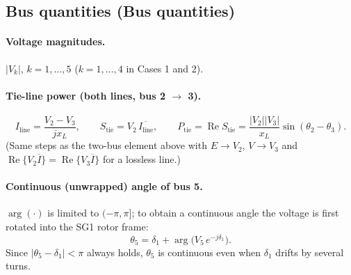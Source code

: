 \documentclass[11pt,a4paper]{article}
\numberwithin{equation}{section}
\newcommand{\cj}[1]{\overline{#1}}
\newcommand{\re}{\operatorname{Re}}
\newcommand{\blk}[1]{\textsf{#1}}
\begin{document}
\subsection{Bus quantities (\blk{Bus quantities})}
\paragraph{Voltage magnitudes.} $|V_k|$, $k=1,\dots,5$ ($k=1,\dots,4$ in Cases 1 and 2).

\paragraph{Tie-line power (both lines, bus 2 $\to$ 3).}
\begin{equation}
I_{\text{line}} = \frac{V_2 - V_3}{jx_L},\qquad
S_{\text{tie}} = V_2\,\cj{I_{\text{line}}},\qquad
\boxed{P_{\text{tie}} = \re S_{\text{tie}} = \frac{|V_2||V_3|}{x_L}\sin(\theta_2-\theta_3).}
\end{equation}
(Same steps as the two-bus element above with $E\to V_2$, $V\to V_3$ and $\re\{V_2\cj I\}=\re\{V_3\cj I\}$ for a lossless line.)

\paragraph{Continuous (unwrapped) angle of bus 5.}
$\arg(\cdot)$ is limited to $(-\pi,\pi]$; to obtain a continuous angle the voltage is first rotated into the SG1 rotor frame:
\begin{equation}
\boxed{\theta_5 = \delta_1 + \arg\!\big(V_5\,e^{-j\delta_1}\big).}
\end{equation}
Since $|\theta_5-\delta_1|<\pi$ always holds, $\theta_5$ is continuous even when $\delta_1$ drifts by several turns.
\end{document}
